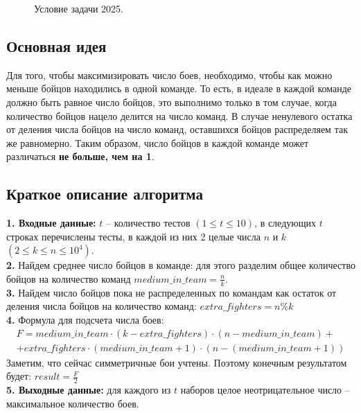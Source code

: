 \documentclass[a5paper, 10pt]{article}
\theoremstyle{definition}
\theoremstyle{plain}
\theoremstyle{remark}
\begin{document}
\begin{figure}[h]
\caption{Условие задачи 2025.}
\end{figure}


\subsection{Основная идея}
Для того, чтобы максимизировать число боев, необходимо, чтобы как можно меньше бойцов находились в одной команде. То есть, в идеале в каждой команде должно быть равное число бойцов, это выполнимо только в том случае, когда количество бойцов нацело делится на число команд. В случае ненулевого остатка от деления числа бойцов на число команд, оставшихся бойцов распределяем так же равномерно. Таким образом, число бойцов в каждой команде может различаться \textbf{не больше, чем на 1}.

\subsection{Краткое описание алгоритма}
\textbf{1. Входные данные:} $t$ -- количество тестов $(1 \leq t \leq 10)$,  в следующих $t$ строках перечислены тесты, в каждой из них 2 целые числа $n$ и $k$ $ (2 \leq k \leq n \leq 10^4)$.\\
\textbf{2.} Найдем среднее число бойцов в команде: для этого разделим общее количество бойцов на количество команд $medium\_in\_team = \frac{n}{k}$.\\
\textbf{3.} Найдем число бойцов пока не распределенных по командам как остаток от деления числа бойцов на количество команд: $extra\_fighters = n \%k$\\
\textbf{4.} Формула для подсчета числа боев: 
\begin{multline*}
F =medium\_in\_team \cdot (k - extra\_fighters) \cdot (n - medium\_in\_team) + \\
+ extra\_fighters \cdot (medium\_in\_team + 1) \cdot (n -( medium\_in\_team + 1))
\end{multline*}
Заметим, что сейчас симметричные бои учтены. Поэтому конечным результатом будет: $result = \frac{F}{2}$\\
\textbf{5. Выходные данные:} для каждого из $t$ наборов целое неотрицательное число -- максимальное количество боев.
\end{document}

